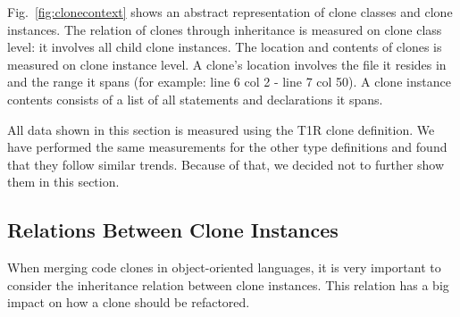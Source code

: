 \documentclass[a4paper]{article}
\begin{document}
Fig.~\ref{fig:clonecontext} shows an abstract representation of clone classes and clone instances. The relation of clones through inheritance is measured on clone class level: it involves all child clone instances. The location and contents of clones is measured on clone instance level. A clone's location involves the file it resides in and the range it spans (for example: line 6 col 2 - line 7 col 50). A clone instance contents consists of a list of all statements and declarations it spans.

All data shown in this section is measured using the T1R clone definition. We have performed the same measurements for the other type definitions and found that they follow similar trends. Because of that, we decided not to further show them in this section.

\subsection{Relations Between Clone Instances} \label{chap:relationsinstances}
When merging code clones in object-oriented languages, it is very important to consider the inheritance relation between clone instances. This relation has a big impact on how a clone should be refactored.
\end{document}
